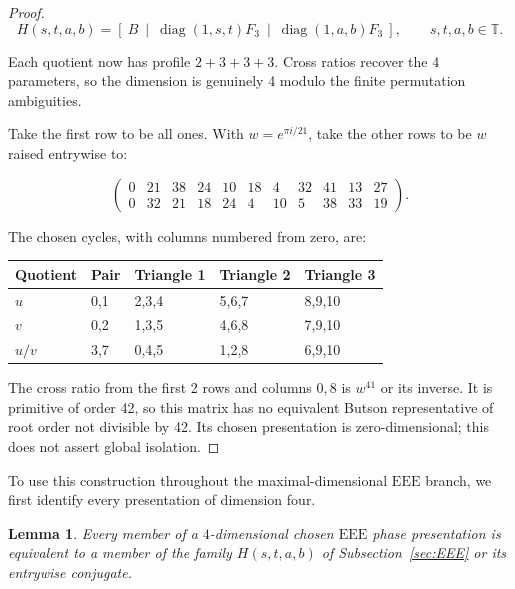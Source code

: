 \documentclass[11pt,a4paper]{article}
\newtheorem{lemma}[theorem]{Lemma}
\theoremstyle{plain}
\theoremstyle{definition}
\theoremstyle{plain}
\begin{document}
\begin{proof}
\[
H(s,t,a,b)= \left[\ B\ \middle|\ \operatorname{diag}(1,s,t)F_3\ \middle|\ \operatorname{diag}(1,a,b)F_3\ \right], \qquad s,t,a,b\in\mathbb T.
\]

Each quotient now has profile $2+3+3+3$. Cross ratios recover the 4 parameters, so the dimension is genuinely 4 modulo the finite permutation ambiguities.

\medskip
Take the first row to be all ones. With $w=e^{\pi i/21}$, take the other rows to be $w$ raised entrywise to:

$$\begin{pmatrix}
0&21&38&24&10&18&4&32&41&13&27\\
0&32&21&18&24&4&10&5&38&33&19
\end{pmatrix}.$$

The chosen cycles, with columns numbered from zero, are:

\begin{center}
\begin{tabular}{@{}lllll@{}}
\toprule
Quotient & Pair & Triangle 1 & Triangle 2 & Triangle 3 \\
\midrule


$u$ & 0,1 & 2,3,4 & 5,6,7 & 8,9,10 \\
$v$ & 0,2 & 1,3,5 & 4,6,8 & 7,9,10 \\
$u/v$ & 3,7 & 0,4,5 & 1,2,8 & 6,9,10 \\
\end{tabular}
\end{center}

The cross ratio from the first 2 rows and columns $0,8$ is $w^{41}$ or its inverse. It is primitive of order 42, so this matrix has no equivalent Butson representative of root order not divisible by 42. Its chosen presentation is zero-dimensional; this does not assert global isolation.
\end{proof}

To use this construction throughout the maximal-dimensional $\mathrm{EEE}$ branch, we first identify every presentation of dimension four.

\par\addvspace{\medskipamount}\noindent
\begin{minipage}{\linewidth}
\begin{lemma}\label{eee_generic:normal}
Every member of a $4$-dimensional chosen $\mathrm{EEE}$ phase presentation is equivalent to a member of the family $H(s,t,a,b)$ of Subsection~\ref{sec:EEE} or its entrywise conjugate.
\end{lemma}
\end{minipage}
\par\addvspace{\medskipamount}
\end{document}
